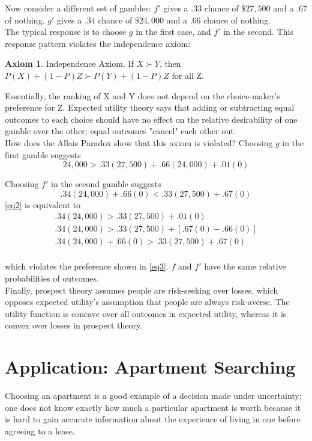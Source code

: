 \documentclass[a4paper,12pt]{article}
\numberwithin{equation}{section}
\theoremstyle{definition}
\newtheorem{remark}{Axiom}
\begin{document}
Now consider a different set of gambles: $f'$ gives a $.33$ chance of $\$27,500$ and a $.67$ of nothing. $g'$ gives a $.34$ chance of $\$24,000$ and a $.66$ chance of nothing.
\\

The typical response is to choose $g$ in the first case, and $f'$ in the second. This response pattern violates the independence axiom: 

\begin{remark}{Independence Axiom.}
If $X \succ Y$, then $P(X) + (1-P)Z \succ P(Y) + (1-P)Z$ for all Z.
\end{remark}

Essentially, the ranking of X and Y does not depend on the choice-maker's preference for Z. Expected utility theory says that adding or subtracting equal outcomes to each choice should have no effect on the relative desirability of one gamble over the other; equal outcomes "cancel" each other out.
\\

How does the Allais Paradox show that this axiom is violated? Choosing $g$ in the first gamble suggests
\begin{equation}\label{eq2}
 24,000 > .33(27,500) + .66(24,000) + .01(0) 
\end{equation}

Choosing $f'$ in the second gamble suggests
\begin{equation}\label{eq3}
.34(24,000) + .66(0) < .33(27,500)+.67(0) 
\end{equation}
\ref{eq2} is equivalent to 
\begin{eqnarray*}
.34(24,000) > .33(27,500)+.01(0)\\
.34(24,000) > .33(27,500)+[.67(0)-.66(0)]\\
.34(24,000) + .66(0) > .33(27,500)+.67(0)\\
\end{eqnarray*}

which violates the preference shown in \ref{eq3}. $f$ and $f'$ have the same relative probabilities of outcomes.
\\

Finally, prospect theory assumes people are risk-seeking over losses, which opposes expected utility's assumption that people are always risk-averse. The utility function is concave over all outcomes in expected utility, whereas it is convex over losses in prospect theory.


\section{Application: Apartment Searching}
Choosing an apartment is a good example of a decision made under uncertainty; one does not know exactly how much a particular apartment is worth because it is hard to gain accurate information about the experience of living in one before agreeing to a lease.
\\
\end{document}
